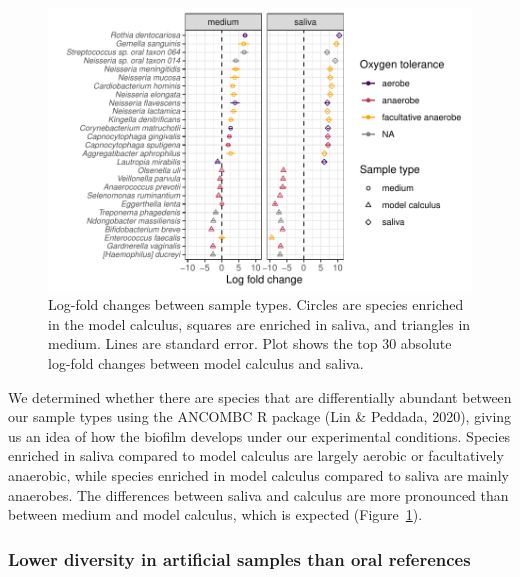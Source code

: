 \documentclass[
]{article}
\begin{document}
\begin{figure}

{\centering \includegraphics{index_files/figure-pdf/fig-diffabund-byoc-1.pdf}

}

\caption{\label{fig-diffabund-byoc}Log-fold changes between sample
types. Circles are species enriched in the model calculus, squares are
enriched in saliva, and triangles in medium. Lines are standard error.
Plot shows the top 30 absolute log-fold changes between model calculus
and saliva.}

\end{figure}

We determined whether there are species that are differentially abundant
between our sample types using the ANCOMBC R package (Lin \& Peddada,
2020), giving us an idea of how the biofilm develops under our
experimental conditions. Species enriched in saliva compared to model
calculus are largely aerobic or facultatively anaerobic, while species
enriched in model calculus compared to saliva are mainly anaerobes. The
differences between saliva and calculus are more pronounced than between
medium and model calculus, which is expected
(Figure~\ref{fig-diffabund-byoc}).

\hypertarget{lower-diversity-in-artificial-samples-than-oral-references}{%
\subsubsection{Lower diversity in artificial samples than oral
references}\label{lower-diversity-in-artificial-samples-than-oral-references}}
\end{document}
